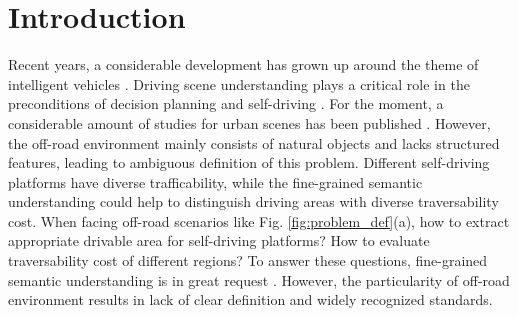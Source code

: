 \documentclass[letterpaper, 10 pt, conference]{ieeeconf}  %
\begin{document}
\section{Introduction}
Recent years, a considerable development has grown up around the theme of intelligent vehicles \cite{feng2020deep}. Driving scene understanding plays a critical role in the preconditions of decision planning and self-driving \cite{badue2020self}. For the moment, a considerable amount of studies for urban scenes has been published \cite{siam2017deep}. However, the off-road environment mainly consists of natural objects and lacks structured features, leading to ambiguous definition of this problem.
Different self-driving platforms have diverse trafficability, while the fine-grained semantic understanding could help to distinguish driving areas with diverse traversability cost. When facing off-road scenarios like Fig. \ref{fig:problem_def}(a), how to extract appropriate drivable area for self-driving platforms? How to evaluate traversability cost of different regions? To answer these questions, fine-grained semantic understanding is in great request \cite{wellhausen2019should}. However, the particularity of off-road environment results in lack of clear definition and widely recognized standards.

\end{document}
